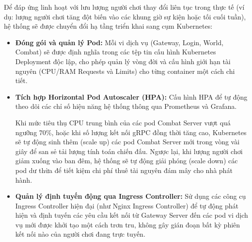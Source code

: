 \documentclass[../Project.tex]{subfiles}
\begin{document}
Để đáp ứng linh hoạt với lưu lượng người chơi thay đổi liên tục trong thực tế (ví dụ: lượng người chơi tăng đột biến vào các khung giờ sự kiện hoặc tối cuối tuần), hệ thống sẽ được chuyển đổi hạ tầng triển khai sang cụm Kubernetes:
\begin{itemize}
    \item \textbf{Đóng gói và quản lý Pod:} Mỗi vi dịch vụ (Gateway, Login, World, Combat) sẽ được định nghĩa trong các tệp tin cấu hình Kubernetes Deployment độc lập, cho phép quản lý vòng đời và cấu hình giới hạn tài nguyên (CPU/RAM Requests và Limits) cho từng container một cách chi tiết.
    \item \textbf{Tích hợp Horizontal Pod Autoscaler (HPA):} Cấu hình HPA để tự động theo dõi các chỉ số hiệu năng hệ thống thông qua Prometheus và Grafana. 
    
    Khi mức tiêu thụ CPU trung bình của các pod Combat Server vượt quá ngưỡng 70\%, hoặc khi số lượng kết nối gRPC đồng thời tăng cao, Kubernetes sẽ tự động sinh thêm (scale up) các pod Combat Server mới trong vòng vài giây để san sẻ tải lượng tính toán chiến đấu. Ngược lại, khi lượng người chơi giảm xuống vào ban đêm, hệ thống sẽ tự động giải phóng (scale down) các pod dư thừa để tiết kiệm chi phí thuê tài nguyên đám mây cho nhà phát hành.
    
    \item \textbf{Quản lý định tuyến động qua Ingress Controller:} Sử dụng các công cụ Ingress Controller hiện đại (như Nginx Ingress Controller) để tự động phát hiện và định tuyến các yêu cầu kết nối từ Gateway Server đến các pod vi dịch vụ mới được khởi tạo một cách trơn tru, không gây gián đoạn bất kỳ phiên kết nối nào của người chơi đang trực tuyến.
\end{itemize}
\end{document}
